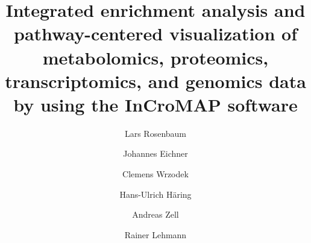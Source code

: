 \documentclass[final,5p,times,twocolumn]{elsarticle}
\newcommand\red[1]{{\color{red}#1}}
\begin{document}
\begin{frontmatter}



\title{\red{Integrated enrichment analysis and pathway-centered visualization of metabolomics, proteomics, transcriptomics, and genomics data by using the InCroMAP software}}


\author[uni]{Lars Rosenbaum}
\author[uni]{Johannes Eichner}
\author[uni]{Clemens Wrzodek}
\author[endo,dzd]{Hans-Ulrich H\"aring}
\author[uni]{Andreas Zell}
\author[zentrallabor,idm,dzd]{Rainer Lehmann}
\address[uni]{Center for Bioinformatics, University of T\"ubingen, T\"ubingen, Germany}
\address[idm]{Institute for Diabetes Research and Metabolic Diseases of the Helmholtz Centre Munich at the University of T\"ubingen, T\"ubingen, Germany}
\address[endo]{Division of Endocrinology, Diabetology, Vascular Medicine, Nephrology and Clinical Chemistry, Department of Internal Medicine IV, University Hospital T\"ubingen, T\"ubingen, Germany}
\address[zentrallabor]{Division of Clinical Chemistry and Pathobiochemistry, Department of Internal Medicine IV, University Hospital T\"ubingen, T\"ubingen, Germany}
\address[dzd]{German Center for Diabetes Research (DZD), Germany}



\end{frontmatter}
\end{document}
